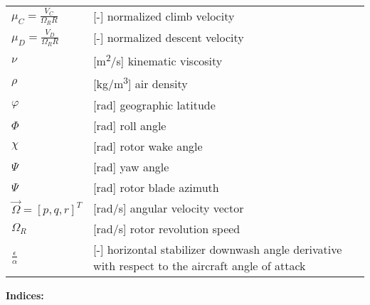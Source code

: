 \begin{longtable}[l]{ l l p{} }
  $\mu_C=\frac{V_C}{\Omega_R R}$                         & [-] normalized climb velocity \\
  $\mu_D=\frac{V_D}{\Omega_R R}$                         & [-] normalized descent velocity \\
  $\nu$                                                  & [m\textsuperscript{2}/s] kinematic viscosity \\
  $\rho$                                                 & [kg/m\textsuperscript{3}] air density \\
  $\varphi$                                              & [rad] geographic latitude \\
  $\Phi$                                                 & [rad] roll angle \\
  $\chi$                                                 & [rad] rotor wake angle \\
  $\Psi$                                                 & [rad] yaw angle \\
  $\Psi$                                                 & [rad] rotor blade azimuth \\
  $\vec \Omega=\left[ p, q, r \right]^T$                 & [rad/s] angular velocity vector \\
  $\Omega_R$                                             & [rad/s] rotor revolution speed \\
  $\frac{\epsilon}{\alpha}$                              & [-] horizontal stabilizer downwash angle derivative with respect to the aircraft angle of attack \\
\end{longtable}

\noindent \textbf{Indices:}

